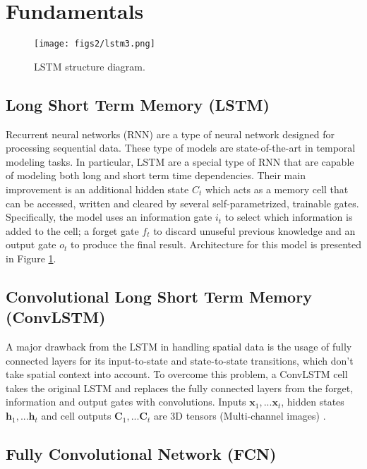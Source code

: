 

\section{Fundamentals}

\begin{figure}[t!]
\centering
\texttt{[image: figs2/lstm3.png]}
\caption{LSTM structure diagram.}
\label{fig:lstm}
\end{figure}
\subsection{Long Short Term Memory (LSTM)}

Recurrent neural networks (RNN) are a type of neural network designed for processing sequential data. These type of models are state-of-the-art in temporal modeling tasks\cite{ma2017ts}. In particular, LSTM are a special type of RNN that are capable of modeling both long and short term time dependencies. Their main improvement is an additional hidden state $C_t$ which acts as a memory cell that can be accessed, written and cleared by several self-parametrized, trainable gates. Specifically, the model uses an information gate $i_t$ to select which information is added to the cell; a forget gate $f_t$ to discard unuseful previous knowledge and an output gate $o_t$ to produce the final result. Architecture for this model is presented in Figure \ref{fig:lstm}.
\subsection{Convolutional Long Short Term Memory (ConvLSTM)}

A major drawback from the LSTM in handling spatial data is the usage of fully connected layers for its input-to-state and state-to-state transitions, which don't take spatial context into account. To overcome this problem, a ConvLSTM cell takes the original LSTM and replaces the fully connected layers from the forget, information and output gates with convolutions. Inputs $\textbf{x}_1,...\textbf{x}_t$, hidden states $\textbf{h}_1,...\textbf{h}_t$ and cell outputs $\textbf{C}_1,...\textbf{C}_t$ are 3D tensors (Multi-channel images) \cite{xingjian2015convolutional}.

\subsection{Fully Convolutional Network (FCN)}

